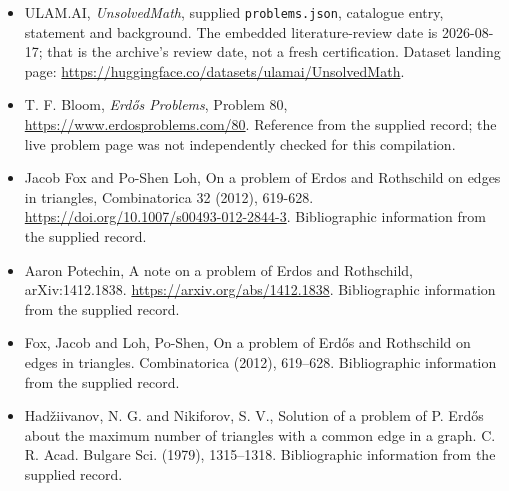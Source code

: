 \documentclass[11pt,a4paper]{article}
\begin{document}
{\small

\begin{itemize}

\item[\hypertarget{source:statement:1}{S1}] ULAM.AI, \emph{UnsolvedMath}, supplied \texttt{problems.json}, catalogue entry, statement and background. The embedded literature-review date is 2026-08-17; that is the archive’s review date, not a fresh certification. Dataset landing page: \url{https://huggingface.co/datasets/ulamai/UnsolvedMath}.

\item[\hypertarget{source:statement:2}{S2}] T. F. Bloom, \emph{Erdős Problems}, Problem 80, \url{https://www.erdosproblems.com/80}. Reference from the supplied record; the live problem page was not independently checked for this compilation.

\item[\hypertarget{source:statement:3}{S3}] Jacob Fox and Po-Shen Loh, On a problem of Erdos and Rothschild on edges in triangles, Combinatorica 32 (2012), 619-628. \url{https://doi.org/10.1007/s00493-012-2844-3}. Bibliographic information from the supplied record.

\item[\hypertarget{source:statement:4}{S4}] Aaron Potechin, A note on a problem of Erdos and Rothschild, arXiv:1412.1838. \url{https://arxiv.org/abs/1412.1838}. Bibliographic information from the supplied record.

\item[\hypertarget{source:statement:5}{S5}] Fox, Jacob and Loh, Po-Shen, On a problem of Erd\H{o}s and {R}othschild on edges in triangles. Combinatorica (2012), 619--628. Bibliographic information from the supplied record.

\item[\hypertarget{source:statement:6}{S6}] Had\v ziivanov, N. G. and Nikiforov, S. V., Solution of a problem of {P}. Erd\H{o}s about the maximum number of triangles with a common edge in a graph. C. R. Acad. Bulgare Sci. (1979), 1315--1318. Bibliographic information from the supplied record.

\end{itemize}

}

\label{end:statement}
\end{document}
